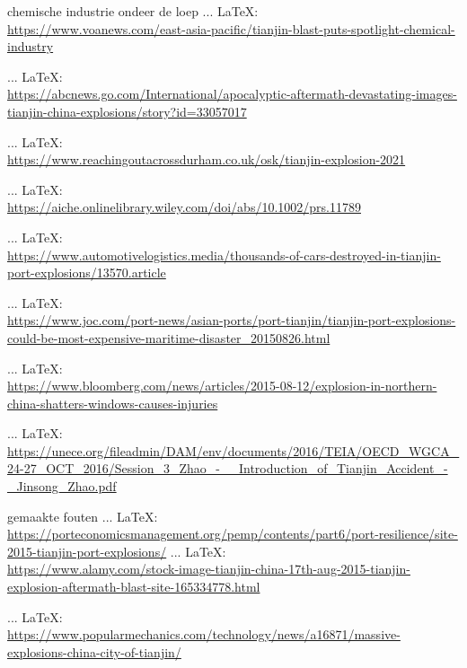 \begin{thebibliography}{99}
    chemische industrie ondeer de loep
     ... \LaTeX:\\ \url{https://www.voanews.com/east-asia-pacific/tianjin-blast-puts-spotlight-chemical-industry}

     ... \LaTeX:\\ \url{https://abcnews.go.com/International/apocalyptic-aftermath-devastating-images-tianjin-china-explosions/story?id=33057017}

     ... \LaTeX:\\ \url{https://www.reachingoutacrossdurham.co.uk/osk/tianjin-explosion-2021}

     ... \LaTeX:\\ \url{https://aiche.onlinelibrary.wiley.com/doi/abs/10.1002/prs.11789}
     
     ... \LaTeX:\\ \url{https://www.automotivelogistics.media/thousands-of-cars-destroyed-in-tianjin-port-explosions/13570.article}

     ... \LaTeX:\\ \url{https://www.joc.com/port-news/asian-ports/port-tianjin/tianjin-port-explosions-could-be-most-expensive-maritime-disaster_20150826.html}

     ... \LaTeX:\\ \url{https://www.bloomberg.com/news/articles/2015-08-12/explosion-in-northern-china-shatters-windows-causes-injuries}

     ... \LaTeX:\\ \url{https://unece.org/fileadmin/DAM/env/documents/2016/TEIA/OECD_WGCA_24-27_OCT_2016/Session_3_Zhao_-__Introduction_of_Tianjin_Accident_-_Jinsong_Zhao.pdf}

    gemaakte fouten
     ... \LaTeX:\\ \url{https://porteconomicsmanagement.org/pemp/contents/part6/port-resilience/site-2015-tianjin-port-explosions/}
     ... \LaTeX:\\ \url{https://www.alamy.com/stock-image-tianjin-china-17th-aug-2015-tianjin-explosion-aftermath-blast-site-165334778.html}

     ... \LaTeX:\\ \url{https://www.popularmechanics.com/technology/news/a16871/massive-explosions-china-city-of-tianjin/}


\end{thebibliography}

